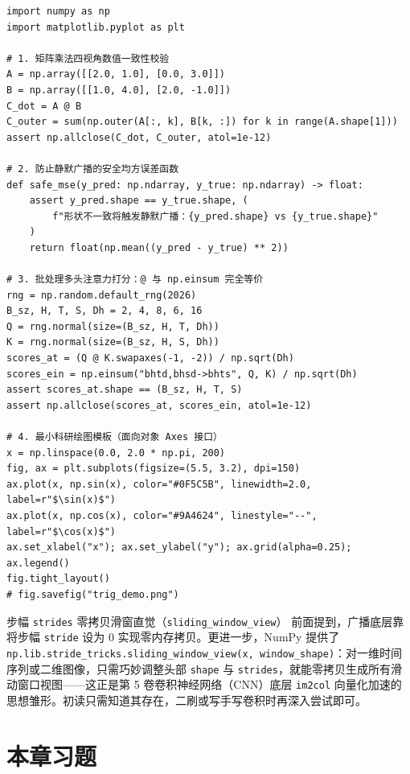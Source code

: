 \begin{lstlisting}[caption={矩阵乘法四视角、多头注意力 \texttt{einsum} 验证与最小可视化模板}, label={lst:ch1-demo}]
import numpy as np
import matplotlib.pyplot as plt

# 1. 矩阵乘法四视角数值一致性校验
A = np.array([[2.0, 1.0], [0.0, 3.0]])
B = np.array([[1.0, 4.0], [2.0, -1.0]])
C_dot = A @ B
C_outer = sum(np.outer(A[:, k], B[k, :]) for k in range(A.shape[1]))
assert np.allclose(C_dot, C_outer, atol=1e-12)

# 2. 防止静默广播的安全均方误差函数
def safe_mse(y_pred: np.ndarray, y_true: np.ndarray) -> float:
    assert y_pred.shape == y_true.shape, (
        f"形状不一致将触发静默广播：{y_pred.shape} vs {y_true.shape}"
    )
    return float(np.mean((y_pred - y_true) ** 2))

# 3. 批处理多头注意力打分：@ 与 np.einsum 完全等价
rng = np.random.default_rng(2026)
B_sz, H, T, S, Dh = 2, 4, 8, 6, 16
Q = rng.normal(size=(B_sz, H, T, Dh))
K = rng.normal(size=(B_sz, H, S, Dh))
scores_at = (Q @ K.swapaxes(-1, -2)) / np.sqrt(Dh)
scores_ein = np.einsum("bhtd,bhsd->bhts", Q, K) / np.sqrt(Dh)
assert scores_at.shape == (B_sz, H, T, S)
assert np.allclose(scores_at, scores_ein, atol=1e-12)

# 4. 最小科研绘图模板（面向对象 Axes 接口）
x = np.linspace(0.0, 2.0 * np.pi, 200)
fig, ax = plt.subplots(figsize=(5.5, 3.2), dpi=150)
ax.plot(x, np.sin(x), color="#0F5C5B", linewidth=2.0, label=r"$\sin(x)$")
ax.plot(x, np.cos(x), color="#9A4624", linestyle="--", label=r"$\cos(x)$")
ax.set_xlabel("x"); ax.set_ylabel("y"); ax.grid(alpha=0.25); ax.legend()
fig.tight_layout()
# fig.savefig("trig_demo.png")
\end{lstlisting}

\begin{extBox}{步幅 \texttt{strides} 零拷贝滑窗直觉（\texttt{sliding\_window\_view}）}
前面提到，广播底层靠将步幅 \texttt{stride} 设为 0 实现零内存拷贝。更进一步，NumPy 提供了 \texttt{np.lib.stride\_tricks.sliding\_window\_view(x, window\_shape)}：对一维时间序列或二维图像，只需巧妙调整头部 \texttt{shape} 与 \texttt{strides}，就能零拷贝生成所有滑动窗口视图——这正是第 5 卷卷积神经网络（CNN）底层 \texttt{im2col} 向量化加速的思想雏形。初读只需知道其存在，二刷或写手写卷积时再深入尝试即可。
\end{extBox}

\section{本章习题}\label{sec:ch01-exercises}

